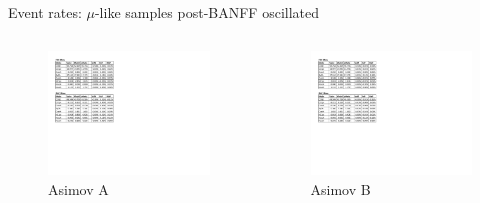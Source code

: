 \documentclass{beamer}
\begin{document}
\begin{frame}{Event rates: $\mu$-like samples post-BANFF oscillated}
	\centering

	\begin{columns}
		\begin{column}{0.5\paperwidth}
			\begin{figure}
				\includegraphics[page=1, trim={0cm 9cm 13cm 1cm}, clip, scale=0.52] {images/rates/postfit_A}
				\caption*{Asimov A}
			\end{figure}
		\end{column}
		\begin{column}{0.5\paperwidth}
			\begin{figure}
				\includegraphics[page=1, trim={0cm 9cm 13cm 1cm}, clip, scale=0.52] {images/rates/postfit_A}
				\caption*{Asimov B}
			\end{figure}
		\end{column}
	\end{columns}
\end{frame}
\end{document}
